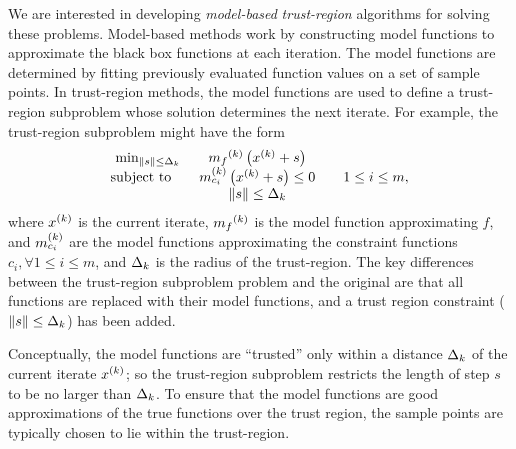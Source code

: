 We are interested in developing {\em model-based} {\em trust-region} algorithms for solving these problems.
Model-based methods work by constructing model functions to approximate the black box functions at each iteration.
The model functions are determined by fitting previously evaluated function values on a set of sample points.
In trust-region methods, the model functions are used to define a trust-region subproblem whose solution determines the next iterate.
For example, the trust-region subproblem might have the form
\begin{align*}
\begin{array}{ccl} \min_{\|s\| \le \Delta_k}
 & {{m}_f}^{(k)} \left(x^{(k)}+s\right) \\
\mbox{subject to} \quad & {{m}^{(k)}_{c_i}}\left(x^{(k)} + s\right) \le 0 & \quad 1 \le i \le m, \\
& \|s\| \le \Delta_k \\
\end{array}
\end{align*}
where $x^{(k)}$ is the current iterate, ${{m}_f}^{(k)}$ is the model function approximating $f$, 
and ${{m}^{(k)}_{c_i}}$ are the model functions approximating the constraint functions $c_i, \forall 1 \le i \le m$, and $\Delta_k$ is the radius of the trust-region.
The key differences between the trust-region subproblem problem and the original are that all functions are replaced with their model functions, 
and a trust region constraint ($\|s\| \le \Delta_k$) has been added.




Conceptually, the model functions are ``trusted'' only within a distance $ \Delta_k $ of the current iterate $x^{(k)}$; 
so the trust-region subproblem restricts the length of step $s$ to be no larger than $\Delta_k$.
To ensure that the model functions are good approximations of the true functions over the trust region, 
the sample points are typically chosen to lie within the trust-region.

